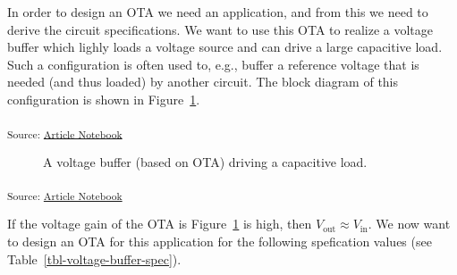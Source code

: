 \documentclass[
  a4paper,
  DIV=11,
  numbers=noendperiod]{scrartcl}
\begin{document}
In order to design an OTA we need an application, and from this we need
to derive the circuit specifications. We want to use this OTA to realize
a voltage buffer which lighly loads a voltage source and can drive a
large capacitive load. Such a configuration is often used to, e.g.,
buffer a reference voltage that is needed (and thus loaded) by another
circuit. The block diagram of this configuration is shown in
Figure~\ref{fig-voltage-buffer-ota}.

\textsubscript{Source:
\href{https://iic-jku.github.io/analog-circuit-design/index.qmd.html}{Article
Notebook}}

\begin{figure}[H]


\caption{\label{fig-voltage-buffer-ota}A voltage buffer (based on OTA)
driving a capacitive load.}

\end{figure}%

\textsubscript{Source:
\href{https://iic-jku.github.io/analog-circuit-design/index.qmd.html}{Article
Notebook}}

If the voltage gain of the OTA is Figure~\ref{fig-voltage-buffer-ota} is
high, then \(V_\mathrm{out} \approx V_\mathrm{in}\). We now want to
design an OTA for this application for the following spefication values
(see Table~\ref{tbl-voltage-buffer-spec}).
\end{document}
